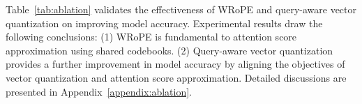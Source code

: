\begin{table}[htb]
    \centering
    \caption{Ablation study on the importance of WRoPE and query-aware vector quantization for accuracy. 
    }
    \label{tab:ablation}
\end{table}

Table~\ref{tab:ablation} validates the effectiveness of WRoPE and query-aware vector quantization
on improving model accuracy.
Experimental results draw the following conclusions: 
(1) WRoPE is fundamental to attention score approximation using shared codebooks.
(2) Query-aware vector quantization provides a further improvement in model accuracy by aligning the objectives of vector quantization and attention score approximation.
Detailed discussions are presented in Appendix~\ref{appendix:ablation}.

